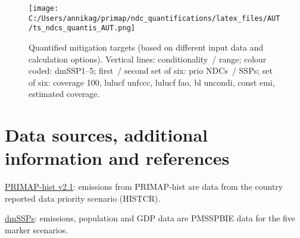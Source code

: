 \documentclass[12pt]{article}
\begin{document}
 \begin{figure}[H]
 \centering
 \texttt{[image: C:/Users/annikag/primap/ndc\_quantifications/latex\_files/AUT/ts\_ndcs\_quantis\_AUT.png]}
 \caption{Quantified mitigation targets (based on different input data and calculation options).
 Vertical lines: conditionality~/ range;
 colour coded: dmSSP1--5;
 first~/ second set of six: prio NDCs~/ SSPs;
 set of six: coverage 100, lulucf unfccc, lulucf fao, bl uncondi, const emi, estimated coverage.}
 \label{fig:miti}
 \end{figure}

 \section{Data sources, additional information and references}
 \label{sec:dataSourcesRefs}

 \noindent \href{https://dataservices.gfz-potsdam.de/pik/showshort.php?id=escidoc:4736895}{PRIMAP-hist v2.1}: emissions from PRIMAP-hist are data from the country reported data priority scenario (HISTCR).

 \noindent \href{https://zenodo.org/record/3638137#.X2syXouxU2w}{dmSSPs}: emissions, population and GDP data are PMSSPBIE data for the five marker scenarios.
\end{document}
